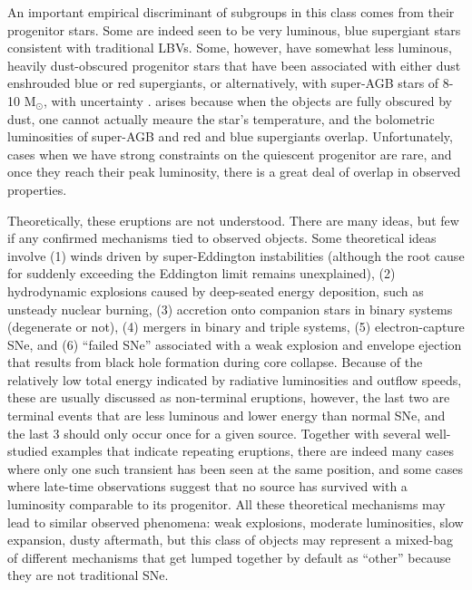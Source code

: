 An important empirical discriminant of subgroups in this class comes
from their progenitor stars.  Some are indeed seen to be very
luminous, blue supergiant stars consistent with traditional LBVs.
Some, however, have somewhat less luminous, heavily dust-obscured
progenitor stars that have been associated with either dust enshrouded
blue or red supergiants, or alternatively, with super-AGB stars of
8-10 M$_{\odot}$, with uncertainty .
arises because when the objects are
fully obscured by dust, one cannot actually meaure the star's
temperature, and the bolometric luminosities of super-AGB and red and blue supergiants overlap.  Unfortunately,
cases when we have strong constraints on the quiescent progenitor are
rare, and once they reach their peak luminosity, there is a great deal
of overlap in observed properties.

Theoretically, these eruptions are not understood.  There are many
ideas, but few if any confirmed mechanisms tied to observed
objects.
Some
theoretical ideas involve (1)
winds driven by super-Eddington instabilities (although the root cause
for suddenly exceeding the Eddington limit remains unexplained), (2)
hydrodynamic explosions caused by deep-seated energy deposition, such
as unsteady nuclear burning, (3) accretion onto companion stars in
binary systems (degenerate or not), (4) mergers in binary and triple
systems, (5) electron-capture SNe, and (6) ``failed SNe'' associated
with a weak explosion and envelope ejection that results from black
hole formation during core collapse.
Because of the relatively low total energy indicated by
radiative luminosities and outflow speeds, these are usually discussed
as non-terminal eruptions, however, the last two are terminal events
that are less luminous and lower energy than normal SNe, and the last
3 should only occur once for a given source.
Together with several well-studied examples that indicate
repeating eruptions, there are indeed many
cases where only one such transient has been seen at the same
position, and some cases where late-time observations suggest that no
source has survived with a luminosity comparable to its progenitor.
All these theoretical mechanisms
may lead to similar observed phenomena: weak explosions, moderate
luminosities, slow expansion, dusty aftermath, but this class of objects
may represent a mixed-bag of different mechanisms that get lumped
together by default as ``other'' because they are not traditional SNe.

